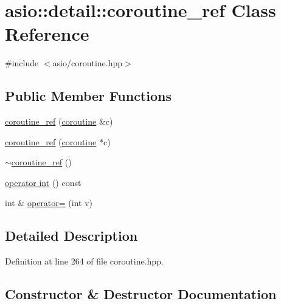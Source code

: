 \hypertarget{classasio_1_1detail_1_1coroutine__ref}{}\section{asio\+:\+:detail\+:\+:coroutine\+\_\+ref Class Reference}
\label{classasio_1_1detail_1_1coroutine__ref}


{\ttfamily \#include $<$asio/coroutine.\+hpp$>$}

\subsection*{Public Member Functions}
\begin{DoxyCompactItemize}
\item 
\hyperlink{classasio_1_1detail_1_1coroutine__ref_af01f176cfd70c484c619cbbdb34fd53b}{coroutine\+\_\+ref} (\hyperlink{classasio_1_1coroutine}{coroutine} \&c)
\item 
\hyperlink{classasio_1_1detail_1_1coroutine__ref_a6f12bcc1f0a2317f2239e4ccd3eb7672}{coroutine\+\_\+ref} (\hyperlink{classasio_1_1coroutine}{coroutine} $\ast$c)
\item 
\hyperlink{classasio_1_1detail_1_1coroutine__ref_a262fe205ffdb857ef88693fcce064457}{$\sim$coroutine\+\_\+ref} ()
\item 
\hyperlink{classasio_1_1detail_1_1coroutine__ref_abcfea713c212531544bd6835926a9244}{operator int} () const 
\item 
int \& \hyperlink{classasio_1_1detail_1_1coroutine__ref_ab52fbe1cebb26be24cbecf98ae2e48b1}{operator=} (int v)
\end{DoxyCompactItemize}


\subsection{Detailed Description}


Definition at line 264 of file coroutine.\+hpp.



\subsection{Constructor \& Destructor Documentation}
\hypertarget{classasio_1_1detail_1_1coroutine__ref_af01f176cfd70c484c619cbbdb34fd53b}{}
